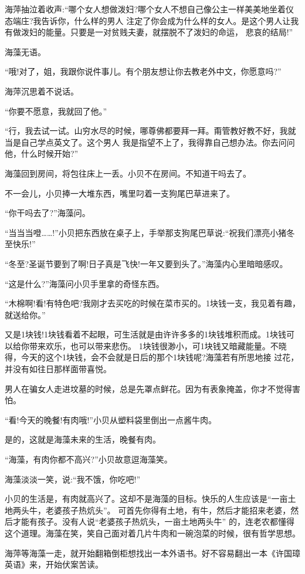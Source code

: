 \documentclass[11pt,a4paper,onecolumn]{article}
\begin{document}
海萍抽泣着收声:``哪个女人想做泼妇?哪个女人不想自己像公主一样美美地坐着仪态端庄?我告诉你，什么样的男人
注定了你会成为什么样的女人。是这个男人让我有做泼妇的能量。只要是一对贫贱夫妻，就摆脱不了泼妇的命运，
悲哀的结局!''

海藻无语。

``哦!对了，姐，我跟你说件事儿。有个朋友想让你去教老外中文，你愿意吗?''

海萍沉思着不说话。

``你要不愿意，我就回了他。''

``行，我去试一试。山穷水尽的时候，哪尊佛都要拜一拜。甭管教好教不好，我就当是自己学点英文了。这个男人
我是指望不上了，我得靠自己想办法。你去问问他，什么时候开始?''

海藻回到房间，将包往床上一丢。小贝不在房间。不知道干吗去了。

不一会儿，小贝捧一大堆东西，嘴里叼着一支狗尾巴草进来了。

``你干吗去了?''海藻问。

``当当当噔……!''小贝把东西放在桌子上，手举那支狗尾巴草说:``祝我们漂亮小猪冬至快乐!''

``冬至?圣诞节要到了啊!日子真是飞快!一年又要到头了。''海藻内心里暗暗感叹。

``这是什么?''海藻问小贝手里拿的奇怪东西。

``木棉啊!看!有特色吧?我刚才去买吃的时候在菜市买的。1块钱一支，我见着有趣，就送给你。''

又是1块钱!1块钱看着不起眼，可生活就是由许许多多的1块钱堆积而成。1块钱可以给你带来欢乐，也可以带来悲伤。
1块钱很渺小，可1块钱又暗藏能量。不晓得，今天的这个1块钱，会不会就是日后的那个1块钱呢?海藻若有所思地接
过花，并没有如往日那样面带喜悦。

男人在骗女人走进坟墓的时候，总是先罩点鲜花。因为有表象掩盖，你才不觉得害怕。

``看!今天的晚餐!有肉哦!''小贝从塑料袋里倒出一点酱牛肉。

是的，这就是海藻未来的生活，晚餐有肉。

``海藻，有肉你都不高兴?''小贝故意逗海藻笑。

海藻淡淡一笑，说:``我不饿，你吃吧!''

小贝的生活是，有肉就高兴了。这却不是海藻的目标。快乐的人生应该是``一亩土地两头牛，老婆孩子热炕头''。
可首先你得有土地，有牛，然后才能招来老婆，然后才能有孩子。没有人说``老婆孩子热炕头，一亩土地两头牛''
的，连老农都懂得这个道理。海藻在笑，笑自己面对着几片牛肉和一碗泡菜的时候，很有哲学思想。

海萍等海藻一走，就开始翻箱倒柜想找出一本外语书。好不容易翻出一本《许国璋英语》来，开始伏案苦读。
\end{document}
